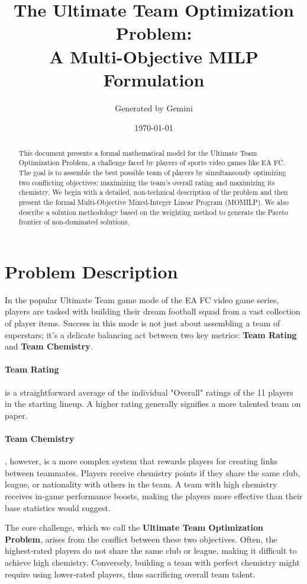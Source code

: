 \documentclass{article}
\title{The Ultimate Team Optimization Problem: \\ A Multi-Objective MILP Formulation}
\author{Generated by Gemini}
\date{\today}
\begin{document}
\maketitle

\begin{abstract}
This document presents a formal mathematical model for the Ultimate Team Optimization Problem, a challenge faced by players of sports video games like EA FC. The goal is to assemble the best possible team of players by simultaneously optimizing two conflicting objectives: maximizing the team's overall rating and maximizing its chemistry. We begin with a detailed, non-technical description of the problem and then present the formal Multi-Objective Mixed-Integer Linear Program (MOMILP). We also describe a solution methodology based on the weighting method to generate the Pareto frontier of non-dominated solutions.
\end{abstract}

\section{Problem Description}
In the popular Ultimate Team game mode of the EA FC video game series, players are tasked with building their dream football squad from a vast collection of player items. Success in this mode is not just about assembling a team of superstars; it's a delicate balancing act between two key metrics: \textbf{Team Rating} and \textbf{Team Chemistry}.

\paragraph{Team Rating} is a straightforward average of the individual "Overall" ratings of the 11 players in the starting lineup. A higher rating generally signifies a more talented team on paper.

\paragraph{Team Chemistry}, however, is a more complex system that rewards players for creating links between teammates. Players receive chemistry points if they share the same club, league, or nationality with others in the team. A team with high chemistry receives in-game performance boosts, making the players more effective than their base statistics would suggest.

The core challenge, which we call the \textbf{Ultimate Team Optimization Problem}, arises from the conflict between these two objectives. Often, the highest-rated players do not share the same club or league, making it difficult to achieve high chemistry. Conversely, building a team with perfect chemistry might require using lower-rated players, thus sacrificing overall team talent.
\end{document}
